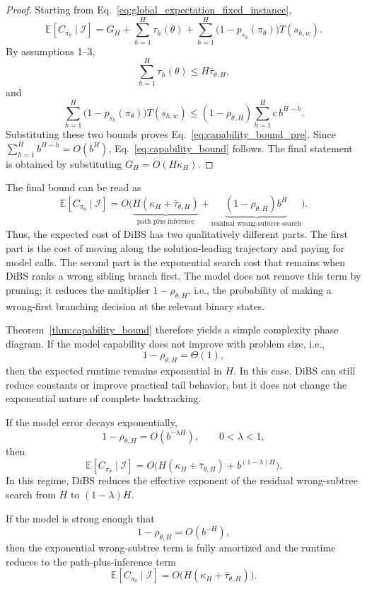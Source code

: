 \documentclass[lettersize,journal]{IEEEtran}
\begin{document}
\begin{proof}
	Starting from Eq.~\eqref{eq:global_expectation_fixed_instance},
	\[
	\mathbb{E}[C_{\pi_\theta}\mid \mathcal{I}]
	=
	G_H
	+
	\sum_{h=1}^{H} \tau_h(\theta)
	+
	\sum_{h=1}^{H}
	\bigl(1-p_{s_h}(\pi_\theta)\bigr)T(s_{h,w}).
	\]
	By assumptions 1--3,
	\[
	\sum_{h=1}^{H} \tau_h(\theta)
	\le
	H\bar{\tau}_{\theta,H},
	\]
	and
	\[
	\sum_{h=1}^{H}
	\bigl(1-p_{s_h}(\pi_\theta)\bigr)T(s_{h,w})
	\le
	(1-\rho_{\theta,H})
	\sum_{h=1}^{H} c\,b^{H-h}.
	\]
	Substituting these two bounds proves Eq.~\eqref{eq:capability_bound_pre}.
	Since \(\sum_{h=1}^{H} b^{H-h}=O(b^H)\),
	Eq.~\eqref{eq:capability_bound} follows. The final statement is
	obtained by substituting \(G_H=O(H\kappa_H)\).
\end{proof}

The final bound can be read as
\[
\mathbb{E}[C_{\pi_\theta}\mid \mathcal{I}]
=
O\!\Big(
\underbrace{H(\kappa_H+\bar{\tau}_{\theta,H})}_{\text{path plus inference}}
+
\underbrace{(1-\rho_{\theta,H})b^H}_{\text{residual wrong-subtree search}}
\Big).
\]
Thus, the expected cost of DiBS has two qualitatively different parts.
The first part is the cost of moving along the solution-leading trajectory
and paying for model calls. The second part is the exponential search
cost that remains when DiBS ranks a wrong sibling branch first. The model
does not remove this term by pruning; it reduces the multiplier
\(1-\rho_{\theta,H}\), i.e., the probability of making a wrong-first
branching decision at the relevant binary states.

Theorem~\ref{thm:capability_bound} therefore yields a simple complexity
phase diagram. If the model capability does not improve with problem
size, i.e.,
\[
1-\rho_{\theta,H}=\Theta(1),
\]
then the expected runtime remains exponential in \(H\). In this case,
DiBS can still reduce constants or improve practical tail behavior, but
it does not change the exponential nature of complete backtracking.

If the model error decays exponentially,
\[
1-\rho_{\theta,H}=O(b^{-\lambda H}),
\qquad 0<\lambda<1,
\]
then
\[
\mathbb{E}[C_{\pi_\theta}\mid \mathcal{I}]
=
O\!\Big(
H(\kappa_H+\bar{\tau}_{\theta,H})
+
b^{(1-\lambda)H}
\Big).
\]
In this regime, DiBS reduces the effective exponent of the residual
wrong-subtree search from \(H\) to \((1-\lambda)H\).

If the model is strong enough that
\[
1-\rho_{\theta,H}=O(b^{-H}),
\]
then the exponential wrong-subtree term is fully amortized and the
runtime reduces to the path-plus-inference term
\[
\mathbb{E}[C_{\pi_\theta}\mid \mathcal{I}]
=
O\!\big(H(\kappa_H+\bar{\tau}_{\theta,H})\big).
\]
\end{document}
